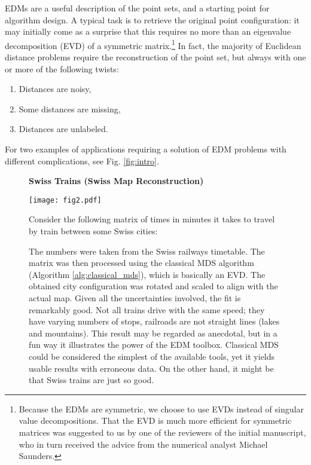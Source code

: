 \documentclass[10pt,double]{IEEEtran}
\newcommand{\rev}[1]{{#1}}
\begin{document}
EDMs are a useful description of the point sets, and a starting point for
algorithm design. A typical task is to retrieve the original point
configuration: it may initially come as a surprise that this requires no more
than an eigenvalue decomposition (EVD) of a symmetric
matrix.\footnote{\rev{Because the EDMs are symmetric, we choose to use EVDs
instead of singular value decompositions. That the EVD is much more efficient for
symmetric matrices was suggested to us by one of the reviewers of the initial
manuscript, who in turn received the advice from the numerical analyst Michael
Saunders.}} In fact, the majority of Euclidean distance problems require the
reconstruction of the point set, but always with one or more of the following
twists:
\begin{enumerate}
	\item Distances are noisy,
	\item Some distances are missing,
	\item Distances are unlabeled.
\end{enumerate}
For two examples of applications requiring a solution of EDM problems with
different complications, see Fig. \ref{fig:intro}.
\begin{figure}[t]
\selectfont
\begin{spmagbox}
\textbf{Swiss Trains (Swiss Map Reconstruction)}
\\
\fontsize{9pt}{10pt}
\begin{center}
	\texttt{[image: fig2.pdf]}
\end{center}
\vspace{8mm}

\selectfont
Consider the following matrix of times in minutes it takes to travel by train
between some Swiss cities:

The numbers were taken from the Swiss railways timetable. The matrix
was then processed using the classical MDS algorithm (Algorithm
\ref{alg:classical_mds}), which is basically an EVD. The obtained city
configuration was rotated and scaled to align with the actual map. Given all
the uncertainties involved, the fit is remarkably good. Not all trains drive
with the same speed; they have varying numbers of stops, railroads are not
straight lines (lakes and mountains). This result may be regarded as
anecdotal, but in a fun way it illustrates the power of the EDM toolbox.
Classical MDS could be considered the simplest of the available tools, yet it
yields usable results with erroneous data. On the other hand, it might be that
Swiss trains are just so good. 
\end{spmagbox}
\end{figure}
\end{document}
